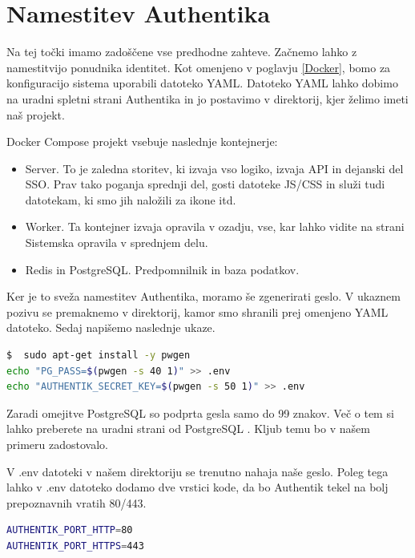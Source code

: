 \documentclass[a4paper,12pt,openright]{book}
\begin{document}
\section{Namestitev Authentika}

Na tej točki imamo zadoščene vse predhodne zahteve. Začnemo lahko z namestitvijo ponudnika identitet. Kot omenjeno v poglavju \ref{Docker}, bomo za konfiguracijo sistema uporabili datoteko YAML. Datoteko YAML lahko dobimo na uradni spletni strani Authentika\cite{AuthentikYAML} in jo postavimo v direktorij, kjer želimo imeti naš projekt. 

Docker Compose projekt vsebuje naslednje kontejnerje:

\begin{itemize}
    \item Server. To je zaledna storitev, ki izvaja vso logiko, izvaja API in dejanski del SSO. Prav tako poganja sprednji del, gosti datoteke JS/CSS in služi tudi datotekam, ki smo jih naložili za ikone itd.
    \item Worker. Ta kontejner izvaja opravila v ozadju, vse, kar lahko vidite na strani Sistemska opravila v sprednjem delu.
    \item Redis in PostgreSQL. Predpomnilnik in baza podatkov.
\end{itemize}

Ker je to sveža namestitev Authentika, moramo še zgenerirati geslo. V ukaznem pozivu se premaknemo v direktorij, kamor smo shranili prej omenjeno YAML datoteko. Sedaj napišemo naslednje ukaze.

\begin{lstlisting}[language=bash]
$  sudo apt-get install -y pwgen
echo "PG_PASS=$(pwgen -s 40 1)" >> .env
echo "AUTHENTIK_SECRET_KEY=$(pwgen -s 50 1)" >> .env
\end{lstlisting}

Zaradi omejitve PostgreSQL so podprta gesla samo do 99 znakov. Več o tem si lahko preberete na uradni strani od PostgreSQL \cite{PostgreSQL}. Kljub temu bo v našem primeru zadostovalo. \newline

V .env datoteki v našem direktoriju se trenutno nahaja naše geslo. Poleg tega lahko v .env datoteko dodamo dve vrstici kode, da bo Authentik tekel na bolj prepoznavnih vratih 80/443. 

\begin{lstlisting}[language=bash]
AUTHENTIK_PORT_HTTP=80
AUTHENTIK_PORT_HTTPS=443
\end{lstlisting}
\end{document}
